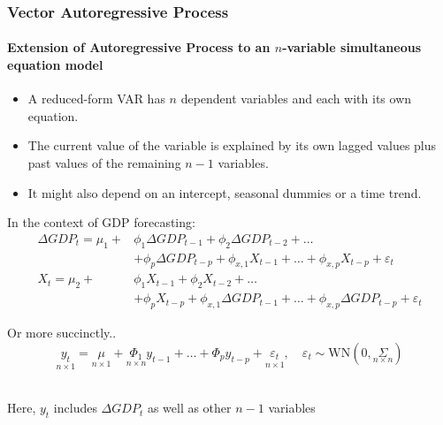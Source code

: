 \begin{frame}[allowframebreaks]
    \frametitle{Vector Autoregressive Process}
    \framesubtitle{Extension of Autoregressive Process to an $n$-variable simultaneous equation model}

    \begin{center}
        \begin{itemize}
            \item A reduced-form VAR has $n$ dependent variables and each with its own equation.
            \item The current value of the variable is explained by its own lagged values plus past values of the remaining $n-1$ variables.
            \item It might also depend on an intercept, seasonal dummies or a time trend.
        \end{itemize}
        \parencite[254]{ghysels_2018_applied}
    \end{center}
    In the context of GDP forecasting:
    \begin{align*}
        \Delta {GDP}_{t}=\mu_1+ & \phi_{1} {\Delta {GDP}}_{t-1}+\phi_{2} {\Delta {GDP}}_{t-2}+\ldots \\ & + \phi_{p} {\Delta {GDP}}_{t-p} +\phi_{x, 1} X_{t-1} + \ldots + \phi_{x, p} X_{t-p} +\varepsilon_{t} \\
        {X}_{t}=\mu_2+          & \phi_{1} {X}_{t-1}+\phi_{2} {X}_{t-2}+\ldots                       \\ & + \phi_{p} {X}_{t-p} +\phi_{x, 1} \Delta {GDP}_{t-1} + \ldots + \phi_{x, p} \Delta {GDP}_{t-p} +\varepsilon_{t}
    \end{align*}
    \begin{center}
        Or more succinctly..
        $$\underset{n \times 1}{y_t}=\underset{n \times 1}{\mu}+\underset{n \times n}{\Phi_1} y_{t-1}+\ldots+\Phi_p y_{t-p}+\underset{n \times 1}{\varepsilon_t}, \quad \varepsilon_t \sim \mathrm{WN}(0, \underset{n \times n}{\Sigma})$$
        \parencite[254]{ghysels_2018_applied}\\
        \par
        Here, $y_t$ includes $\Delta {GDP}_{t}$ as well as other $n-1$ variables
    \end{center}
\end{frame}